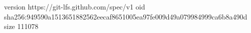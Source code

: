 version https://git-lfs.github.com/spec/v1
oid sha256:949590a1513651882562eecaf8651005ea97fe009d49a079984999ca6b8a490d
size 111078
